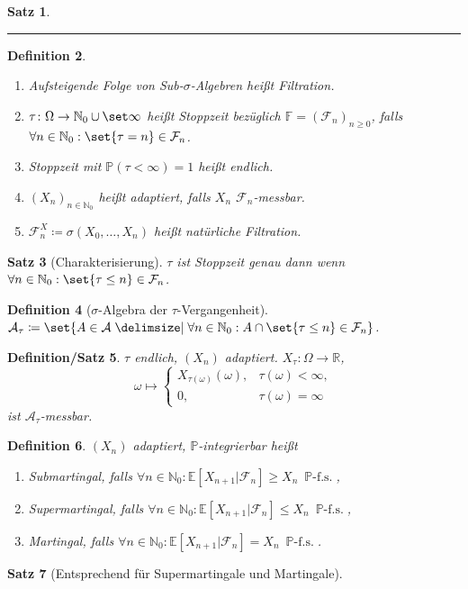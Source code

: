\documentclass[a4paper,8pt]{article}
\newcounter{Sec}
\theoremstyle{nonumberbreak}
\newtheorem{definition}{Definition}[Sec]
\newtheorem{satz}[definition]{Satz}
\newtheorem{defsatz}[definition]{Definition/Satz}
\newcommand{\sep}{%
	\rule{\linewidth}{0.15pt}%
	\stepcounter{Sec}%
	}
\newcommand{\defas}{\coloneqq}
\renewcommand{\P}{\mathbb{P}}
\newcommand{\R}{\mathbb{R}}
\newcommand{\F}{\mathcal{F}}
\newcommand{\E}{\mathbb{E}}
\newcommand{\EV}[2]{\E[#1|#2]}
\newcommand{\N}{\mathbb{N}}
\newcommand{\fs}[1]{~\operatorname{#1-f.s.}}
\begin{document}
\begin{multicols}{3}
\begin{satz}
\[		\]
	\end{satz}
	\sep
	\begin{definition}
		\begin{enumerate}[label=(\alph*)]
			\item Aufsteigende Folge von Sub-$\sigma$-Algebren heißt Filtration.
			\item $\tau\colon\Omega\to\N_0\cup\set\infty$ heißt Stoppzeit bezüglich
				$\mathbb{F}=(\F_n)_{n\geq0}$, falls $\forall n\in\N_0:\set{\tau=n}\in\F_n$.
			\item Stoppzeit mit $\P(\tau<\infty)=1$ heißt endlich.
			\item $(X_n)_{n\in\N_0}$ heißt adaptiert, falls $X_n$ $\F_n$-messbar.
			\item $\F_n^X\defas\sigma(X_0,\ldots,X_n)$ heißt natürliche Filtration.
		\end{enumerate}
	\end{definition}
	\begin{satz}[Charakterisierung]
		$\tau$ ist Stoppzeit genau dann wenn $\forall n\in\N_0:\set{\tau\leq n}\in\F_n$.
	\end{satz}
	\begin{definition}[$\sigma$-Algebra der $\tau$-Vergangenheit]
		$\mathcal{A}_\tau\defas\set{A\in\mathcal{A}\given \forall n\in\N_0:A\cap\set{\tau\leq n}\in\F_n}$.
	\end{definition}
	\begin{defsatz}
		$\tau$ endlich, $(X_n)$ adaptiert. $X_\tau\colon\Omega\to\R$,
		\[
			\omega\mapsto\begin{cases}
				X_{\tau(\omega)}(\omega), &\tau(\omega)<\infty,\\
				0, &\tau(\omega)=\infty
			\end{cases}
		\]
		ist $\mathcal{A}_\tau$-messbar.
	\end{defsatz}
	\begin{definition}
		$(X_n)$ adaptiert, $\P$-integrierbar heißt
		\begin{enumerate}[label=(\alph*)]
			\item Submartingal, falls $\forall n\in\N_0:\EV{X_{n+1}}{\F_n}\geq X_n\fs{\P}$,
			\item Supermartingal, falls $\forall n\in\N_0:\EV{X_{n+1}}{\F_n}\leq X_n\fs{\P}$,
			\item Martingal, falls $\forall n\in\N_0:\EV{X_{n+1}}{\F_n} = X_n\fs{\P}$.
		\end{enumerate}
	\end{definition}
	\begin{satz}[Entsprechend für Supermartingale und Martingale]

\end{satz}
\end{multicols}
\end{document}
